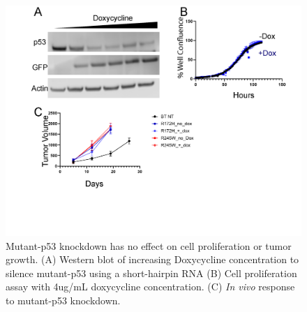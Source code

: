 \begin{figure}
\hypertarget{fig:3.9}{%
\centering
\includegraphics[width=1\textwidth,height=\textheight]{images/shp53.png}
\caption{Mutant-p53 knockdown has no effect on cell proliferation or tumor growth. (A) Western blot of increasing Doxycycline concentration to silence mutant-p53 using a short-hairpin RNA (B) Cell proliferation assay with 4ug/mL doxycycline concentration. (C) \emph{In vivo} response to mutant-p53 knockdown.}\label{fig:3.9}
}
\end{figure}

